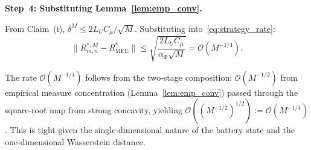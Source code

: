 \documentclass[journal]{IEEEtran}
\begin{document}
\begin{IEEEproof}
\smallskip
\noindent\textbf{Step~4: Substituting
Lemma~\ref{lem:emp_conv}.}

From Claim~(i), $\delta^M \leq 2L_U C_\mu/\sqrt{M}$. Substituting into~\eqref{eq:strategy_rate}:
\begin{equation}
    \|R_{m,n}^{*,M} - R_{\mathrm{MFE}}^*\|
    \leq
    \sqrt{\frac{2L_U C_\mu}{\alpha_\Phi \sqrt{M}}}
    = \mathcal{O}(M^{-1/4}).
\end{equation}

The rate $\mathcal{O}(M^{-1/4})$ follows from the two-stage composition: $\mathcal{O}(M^{-1/2})$ from empirical measure concentration (Lemma~\ref{lem:emp_conv}) passed through the square-root map from strong concavity, yielding $\mathcal{O}((M^{-1/2})^{1/2}) := \mathcal{O}(M^{-1/4})$. This is tight given the single-dimensional nature of the battery state and the one-dimensional Wasserstein distance.

\end{IEEEproof}
\end{document}
